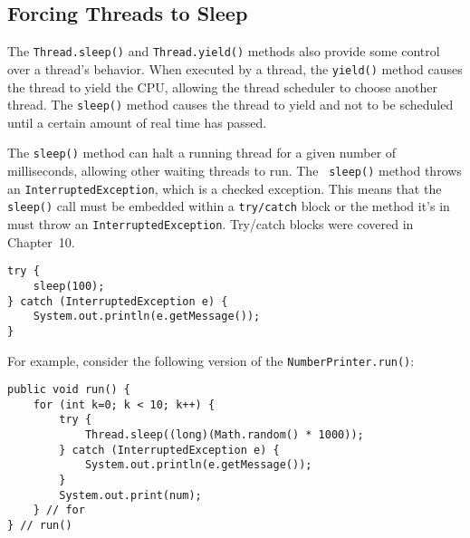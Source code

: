 \subsection{Forcing Threads to Sleep}
\noindent The {\tt Thread.sleep()} and {\tt Thread.yield()} methods also
provide some control over a thread's behavior.  When executed by
a thread, the {\tt yield()} method causes the thread to
yield the CPU, allowing the thread scheduler to choose another
thread.  The {\tt sleep()} method causes the thread to yield
and not to be scheduled until a certain amount of real time
has passed.


\noindent The {\tt sleep()} method can halt a running thread for a given number
of milliseconds, allowing other waiting threads to run.  The {\tt
sleep()} method throws an {\tt InterruptedException}, which is a
checked exception.  This means that the {\tt sleep()} call must be
embedded within a {\tt try/catch} block or the method it's in must
throw an {\tt InterruptedException}.  Try/catch blocks were covered in
Chapter~10.

\begin{jjjlisting}
\begin{lstlisting}
try {
    sleep(100);
} catch (InterruptedException e) {
    System.out.println(e.getMessage());
}
\end{lstlisting}
\end{jjjlisting}

\noindent For example, consider the following version of the
{\tt NumberPrinter.run()}:

\begin{jjjlisting}
\begin{lstlisting}
public void run() {
    for (int k=0; k < 10; k++) {
        try {
            Thread.sleep((long)(Math.random() * 1000));
        } catch (InterruptedException e) {
            System.out.println(e.getMessage());
        }
        System.out.print(num);
    } // for
} // run()
\end{lstlisting}
\end{jjjlisting}

